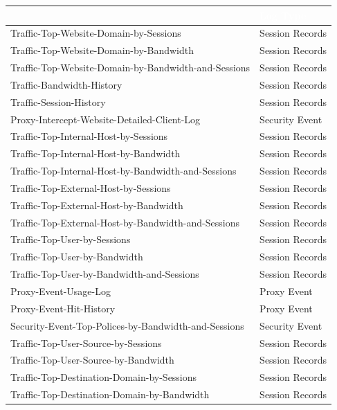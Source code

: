 \begin{longtable}{p{}|p{}}   
    \rowcolor{black}\multicolumn{1}{l!\vlinewhite}{\textcolor{white}{Name}}  & \textcolor{white}{Log Type} \\\hline
    Traffic-Top-Website-Domain-by-Sessions &	Session Records \\\hline 
    Traffic-Top-Website-Domain-by-Bandwidth &	Session Records \\\hline 
    Traffic-Top-Website-Domain-by-Bandwidth-and-Sessions &	Session Records \\\hline 
    Traffic-Bandwidth-History	& Session Records \\\hline 
    Traffic-Session-History	& Session Records \\\hline 
    Proxy-Intercept-Website-Detailed-Client-Log	& Security Event \\\hline 
    Traffic-Top-Internal-Host-by-Sessions	& Session Records \\\hline 
    Traffic-Top-Internal-Host-by-Bandwidth	& Session Records \\\hline 
    Traffic-Top-Internal-Host-by-Bandwidth-and-Sessions	& Session Records \\\hline 
    Traffic-Top-External-Host-by-Sessions	& Session Records \\\hline 
    Traffic-Top-External-Host-by-Bandwidth	& Session Records \\\hline 
    Traffic-Top-External-Host-by-Bandwidth-and-Sessions	& Session Records \\\hline 
    Traffic-Top-User-by-Sessions	& Session Records \\\hline 
    Traffic-Top-User-by-Bandwidth	& Session Records \\\hline 
    Traffic-Top-User-by-Bandwidth-and-Sessions	& Session Records \\\hline 
    Proxy-Event-Usage-Log	& Proxy Event \\\hline 
    Proxy-Event-Hit-History	& Proxy Event \\\hline 
    Security-Event-Top-Polices-by-Bandwidth-and-Sessions	& Security Event \\\hline 
    Traffic-Top-User-Source-by-Sessions	& Session Records \\\hline 
    Traffic-Top-User-Source-by-Bandwidth	& Session Records \\\hline 
    Traffic-Top-Destination-Domain-by-Sessions	& Session Records \\\hline 
    Traffic-Top-Destination-Domain-by-Bandwidth	& Session Records \\\hline 

\end{longtable}

